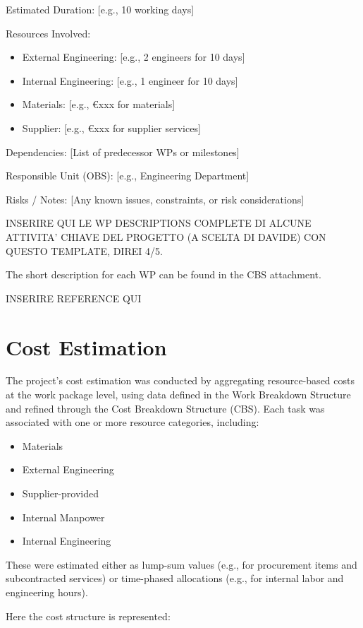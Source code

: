 \documentclass[12pt]{article}
\begin{document}
Estimated Duration: [e.g., 10 working days]

Resources Involved:
\begin{itemize}
        \item External Engineering: [e.g., 2 engineers for 10 days]
        \item Internal Engineering: [e.g., 1 engineer for 10 days]
        \item Materials: [e.g., €xxx for materials]
        \item Supplier: [e.g., €xxx for supplier services]
\end{itemize}

Dependencies:
[List of predecessor WPs or milestones]

Responsible Unit (OBS): [e.g., Engineering Department]

Risks / Notes:
[Any known issues, constraints, or risk considerations]

INSERIRE QUI LE WP DESCRIPTIONS COMPLETE DI ALCUNE ATTIVITA' CHIAVE DEL PROGETTO (A SCELTA DI DAVIDE) CON QUESTO TEMPLATE, DIREI 4/5.

The short description for each WP can be found in the CBS attachment.

INSERIRE REFERENCE QUI

\section{Cost Estimation}

The project’s cost estimation was conducted by aggregating resource-based costs at the work package level, using data defined in the Work Breakdown Structure and refined through the Cost Breakdown Structure (CBS). Each task was associated with one or more resource categories, including:
\begin{itemize}
        \item Materials
        \item External Engineering
        \item Supplier-provided
        \item Internal Manpower
        \item Internal Engineering
\end{itemize}


These were estimated either as lump-sum values (e.g., for procurement items and subcontracted services) or time-phased allocations (e.g., for internal labor and engineering hours).

Here the cost structure is represented:
\end{document}
